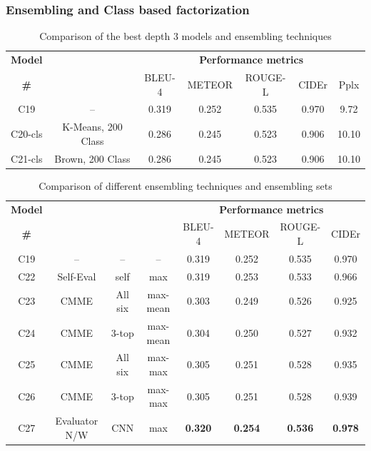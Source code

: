 \subsubsection{Ensembling and Class based factorization}
\begin{table}[htp]
  \centering
  \newcommand{\bs}{\small}
  \begin{adjustbox}{center}
  \begin{tabular}{|c|c|c|c|c|c|c|}
    \hline
    \bf Model & \bf \multirow{2}{*}{Class clustering} & \multicolumn{5}{c|}{\bf Performance metrics}\\
    \cline{3-7}
    \bf \# &\bf &\bs BLEU-4 &\bs METEOR &\bs ROUGE-L &\bs CIDEr&\bs Pplx \\\hline
    C19 & --    & 0.319 & 0.252 & 0.535 & 0.970 & 9.72 \\\hline
    C20-cls &\parbox[c][][c]{4cm}{\smallskip\centering K-Means, 200 Class \smallskip} 
                             & 0.286 & 0.245 & 0.523 & 0.906 & 10.10 \\\hline
    C21-cls &\parbox[c][][c]{4cm}{\smallskip\centering Brown, 200 Class\smallskip} 
                             & 0.286 & 0.245 & 0.523 & 0.906 & 10.10 \\\hline
  \end{tabular}
  \end{adjustbox}
  \caption{Comparison of the best depth 3 models and ensembling techniques}
  \label{tab:resfinalCocValset}
\end{table}

\begin{table}[htp]
  \centering
  \newcommand{\bs}{\small}
  \begin{adjustbox}{center}
  \begin{tabular}{|c|c|c|c|c|c|c|c|}
    \hline
    \bf Model & \bf \multirow{2}{*}{Method} & \bf \multirow{2}{*}{Evaluators}&
    \bf \multirow{2}{*}{Eval type}  & \multicolumn{4}{c|}{\bf Performance metrics}\\
    \cline{5-8}
    \bf \# & & & &\bs BLEU-4 &\bs METEOR &\bs ROUGE-L &\bs CIDEr\\\hline
    C19 & --    & -- & -- & 0.319 & 0.252 & 0.535 & 0.970\\\hline
    C22 & Self-Eval & self      & max      & 0.319 & 0.253 & 0.533 & 0.966\\\hline
    C23 & CMME      &  All six  & max-mean & 0.303 & 0.249 & 0.526 & 0.925\\
    C24 & CMME      &  3-top    & max-mean & 0.304 & 0.250 & 0.527 &
    0.932\\\cline{3-8}
    C25 & CMME      &  All six  & max-max  & 0.305 & 0.251 & 0.528 & 0.935\\
    C26 & CMME      &  3-top    & max-max  & 0.305 & 0.251 & 0.528 & 0.939\\\hline
    C27 & Evaluator N/W & CNN  & max&\bf0.320&\bf0.254 &\bf0.536 &\bf0.978\\\hline
  \end{tabular}
  \end{adjustbox}
  \caption{Comparison of different ensembling techniques and ensembling sets}
  \label{tab:resfinalCocValset}
\end{table}

